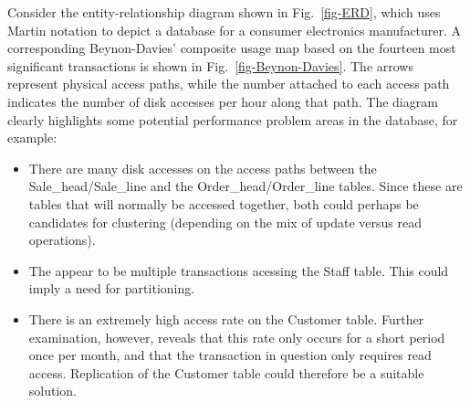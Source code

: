 \documentclass{llncs}
\begin{document}
% 

Consider the entity-relationship diagram shown in Fig.~\ref{fig-ERD},
which uses Martin notation \cite{Mart-J-1990-IE2} to depict a database
for a consumer electronics manufacturer. A corresponding Beynon-Davies'
composite usage map based on the fourteen most significant transactions
is shown in Fig.~\ref{fig-Beynon-Davies}. The arrows represent physical
access paths, while the number attached to each access path indicates
the number of disk accesses per hour along that path. The diagram
clearly highlights some potential performance problem areas in the
database, for example:
\begin{itemize}

	\item There are many disk accesses on the access paths between the
	Sale\_head/Sale\_line and the Order\_head/Order\_line tables. Since
	these are tables that will normally be accessed together, both could
	perhaps be candidates for clustering (depending on the mix of update
	versus read operations).

	\item The appear to be multiple transactions acessing the Staff
	table. This could imply a need for partitioning.
	
	\item There is an extremely high access rate on the Customer table.
	Further examination, however, reveals that this rate only occurs for
	a short period once per month, and that the transaction in question
	only requires read access. Replication of the Customer table could
	therefore be a suitable solution.
	
\end{itemize}
\end{document}
